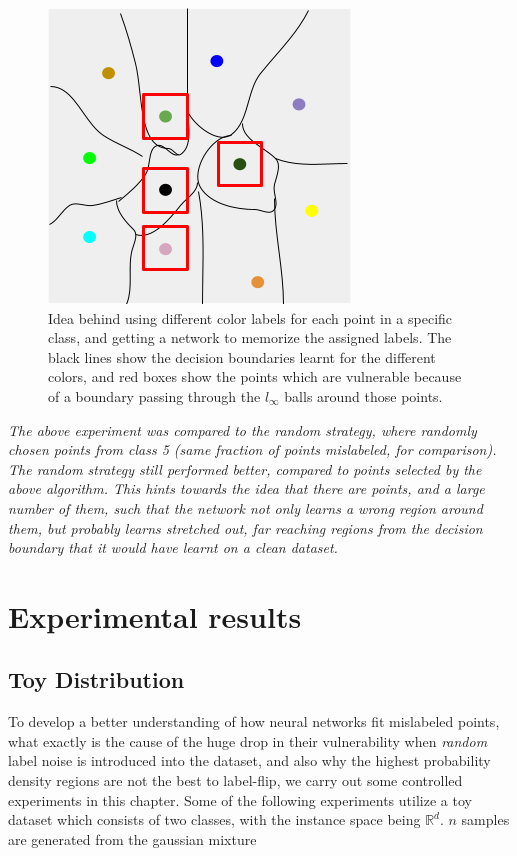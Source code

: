\documentclass[12pt, oneside]{book}
\begin{document}
\begin{figure}[!h]
    \centering
    \includegraphics[scale=0.6, trim={0 0 0 0}, clip]{thesis-coloring-trick.png}
    \caption{Idea behind using different color labels for each point in a specific class, and getting a network to memorize the assigned labels. The black lines show the decision boundaries learnt for the different colors, and red boxes show the points which are vulnerable because of a boundary passing through the $l_\infty$ balls around those points.}
\end{figure}

\emph{The above experiment was compared to the random strategy, where randomly chosen points from class 5 (same fraction of points mislabeled, for comparison). The random strategy still performed better, compared to points selected by the above algorithm. This hints towards the idea that there are points, and a large number of them, such that the network not only learns a wrong region around them, but probably learns stretched out, far reaching regions from the decision boundary that it would have learnt on a clean dataset.}



\chapter{Experimental results}
\label{chapter:experiments}

\section{Toy Distribution}

To develop a better understanding of how neural networks fit mislabeled points,
what exactly is the cause of the huge drop in their vulnerability when
\emph{random} label noise is introduced into the dataset, and also why the
highest probability density regions are not the best to label-flip, we carry out
some controlled experiments in this chapter. Some of the following experiments
utilize a toy dataset which consists of two classes, with the instance space
being $\mathbb{R}^d$. $n$ samples are generated from the gaussian mixture
\end{document}
